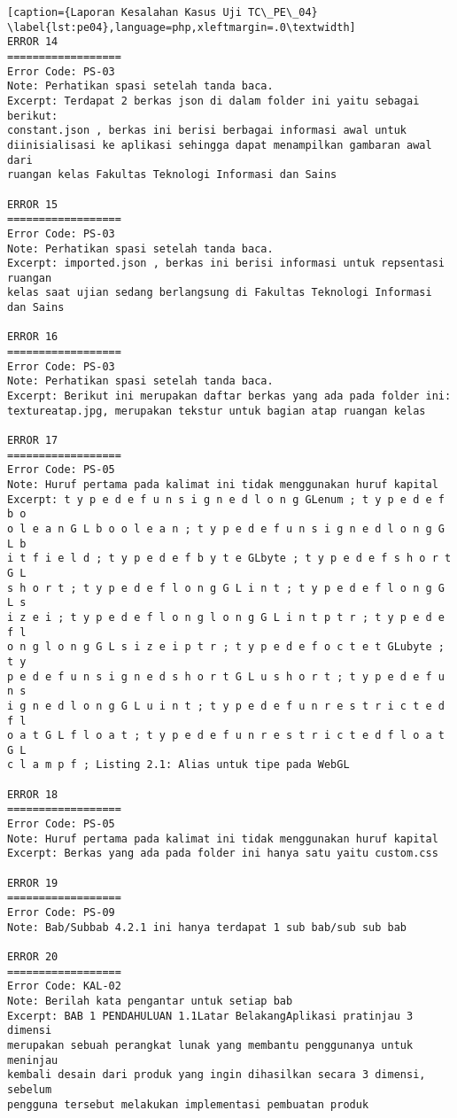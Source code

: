 \begin{enumerate}
\begin{lstlisting}[caption={Laporan Kesalahan Kasus Uji TC\_PE\_04}	\label{lst:pe04},language=php,xleftmargin=.0\textwidth]
ERROR 14
==================
Error Code: PS-03
Note: Perhatikan spasi setelah tanda baca.
Excerpt: Terdapat 2 berkas json di dalam folder ini yaitu sebagai berikut: 
constant.json , berkas ini berisi berbagai informasi awal untuk 
diinisialisasi ke aplikasi sehingga dapat menampilkan gambaran awal dari 
ruangan kelas Fakultas Teknologi Informasi dan Sains

ERROR 15
==================
Error Code: PS-03
Note: Perhatikan spasi setelah tanda baca.
Excerpt: imported.json , berkas ini berisi informasi untuk repsentasi ruangan 
kelas saat ujian sedang berlangsung di Fakultas Teknologi Informasi dan Sains

ERROR 16
==================
Error Code: PS-03
Note: Perhatikan spasi setelah tanda baca.
Excerpt: Berikut ini merupakan daftar berkas yang ada pada folder ini: 
textureatap.jpg, merupakan tekstur untuk bagian atap ruangan kelas

ERROR 17
==================
Error Code: PS-05
Note: Huruf pertama pada kalimat ini tidak menggunakan huruf kapital
Excerpt: t y p e d e f u n s i g n e d l o n g GLenum ; t y p e d e f b o 
o l e a n G L b o o l e a n ; t y p e d e f u n s i g n e d l o n g G L b 
i t f i e l d ; t y p e d e f b y t e GLbyte ; t y p e d e f s h o r t G L 
s h o r t ; t y p e d e f l o n g G L i n t ; t y p e d e f l o n g G L s 
i z e i ; t y p e d e f l o n g l o n g G L i n t p t r ; t y p e d e f l 
o n g l o n g G L s i z e i p t r ; t y p e d e f o c t e t GLubyte ; t y 
p e d e f u n s i g n e d s h o r t G L u s h o r t ; t y p e d e f u n s 
i g n e d l o n g G L u i n t ; t y p e d e f u n r e s t r i c t e d f l 
o a t G L f l o a t ; t y p e d e f u n r e s t r i c t e d f l o a t G L 
c l a m p f ; Listing 2.1: Alias untuk tipe pada WebGL

ERROR 18
==================
Error Code: PS-05
Note: Huruf pertama pada kalimat ini tidak menggunakan huruf kapital
Excerpt: Berkas yang ada pada folder ini hanya satu yaitu custom.css

ERROR 19
==================
Error Code: PS-09
Note: Bab/Subbab 4.2.1 ini hanya terdapat 1 sub bab/sub sub bab

ERROR 20
==================
Error Code: KAL-02
Note: Berilah kata pengantar untuk setiap bab
Excerpt: BAB 1 PENDAHULUAN 1.1Latar BelakangAplikasi pratinjau 3 dimensi 
merupakan sebuah perangkat lunak yang membantu penggunanya untuk meninjau 
kembali desain dari produk yang ingin dihasilkan secara 3 dimensi, sebelum 
pengguna tersebut melakukan implementasi pembuatan produk


\end{lstlisting}
\end{enumerate}
